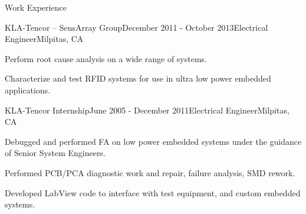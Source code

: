 \documentclass{resume} %
\begin{document}
\begin{rSection}{Work Experience}
\begin{rSubsection}{KLA-Tencor -- SensArray Group}{December 2011 - October 2013}{Electrical Engineer}{Milpitas, CA}
\item Perform root cause analysis on a wide range of systems.
\item Characterize and test RFID systems for use in ultra low power embedded applications.
\end{rSubsection}

\pagebreak[2]
\begin{rSubsection}{KLA-Tencor Internship}{June 2005 - December 2011}{Electrical Engineer}{Milpitas, CA}
\item Debugged and performed FA on low power embedded systems under the guidance of Senior System Engineers. 
\item Performed PCB/PCA diagnostic work and repair, failure analysis, SMD rework.
\item Developed LabView code to interface with test equipment, and custom embedded systems.
\end{rSubsection}

\end{rSection}
\end{document}
